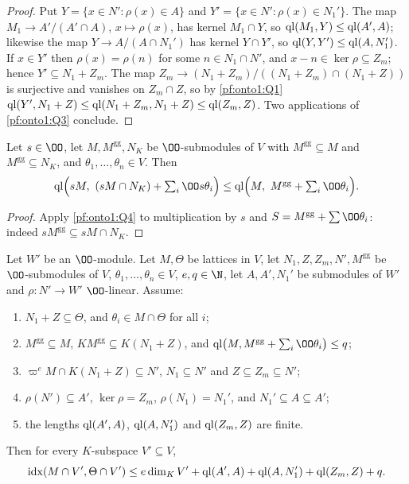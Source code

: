 \begin{proof}
Put $Y=\{x\in N':\rho(x)\in A\}$ and $Y'=\{x\in N':\rho(x)\in N_1'\}$. The map $M_1\to A'/(A'\cap A)$,
$x\mapsto\rho(x)$, has kernel $M_1\cap Y$, so $\operatorname{ql}(M_1,Y)\le\operatorname{ql}(A',A)$; likewise the map $Y\to
A/(A\cap N_1')$ has kernel $Y\cap Y'$, so $\operatorname{ql}(Y,Y')\le\operatorname{ql}(A,N_1')$. If $x\in Y'$ then
$\rho(x)=\rho(n)$ for some $n\in N_1\cap N'$, and $x-n\in\ker\rho\subseteq Z_m$; hence $Y'\subseteq N_1+Z_m$. The
map $Z_m\to(N_1+Z_m)/((N_1+Z_m)\cap(N_1+Z))$ is surjective and vanishes on $Z_m\cap Z$, so by \ref{pf:onto1:Q1}
$\operatorname{ql}(Y',N_1+Z)\le\operatorname{ql}(N_1+Z_m,N_1+Z)\le\operatorname{ql}(Z_m,Z)$. Two applications of \ref{pf:onto1:Q3}
conclude.
\end{proof}

\begin{lemma}[Scaling]\label{pf:onto1:scaled}
Let $s\in\OO$, let $M,M^{\mathrm{gg}},N_K$ be $\OO$-submodules of $V$ with $M^{\mathrm{gg}}\subseteq M$ and
$M^{\mathrm{gg}}\subseteq N_K$, and $\theta_1,\dots,\theta_n\in V$. Then
\[
\ontooneql\Bigl(sM,\ (sM\cap N_K)+\textstyle\sum_i\OO s\theta_i\Bigr)\le
\ontooneql\Bigl(M,\ M^{\mathrm{gg}}+\textstyle\sum_i\OO\theta_i\Bigr).
\]
\end{lemma}

\begin{proof}
Apply \ref{pf:onto1:Q4} to multiplication by $s$ and $S=M^{\mathrm{gg}}+\sum\OO\theta_i$: indeed
$sM^{\mathrm{gg}}\subseteq sM\cap N_K$.
\end{proof}

\begin{proposition}\label{pf:onto1:localStepQ}
Let $W'$ be an $\OO$-module. Let $M,\Theta$ be lattices in $V$, let $N_1,Z,Z_m,N',M^{\mathrm{gg}}$ be $\OO$-submodules
of $V$, $\theta_1,\dots,\theta_n\in V$, $e,q\in\N$, let $A,A',N_1'$ be submodules of $W'$ and $\rho\colon N'\to W'$
$\OO$-linear. Assume:
\begin{enumerate}[label=(\alph*)]
\item $N_1+Z\subseteq\Theta$, and $\theta_i\in M\cap\Theta$ for all $i$;
\item $M^{\mathrm{gg}}\subseteq M$, $KM^{\mathrm{gg}}\subseteq K(N_1+Z)$, and $\ontooneql\bigl(M,M^{\mathrm{gg}}+\sum_i\OO\theta_i\bigr)\le q$;
\item $\varpi^eM\cap K(N_1+Z)\subseteq N'$, $N_1\subseteq N'$ and $Z\subseteq Z_m\subseteq N'$;
\item $\rho(N')\subseteq A'$, $\ker\rho=Z_m$, $\rho(N_1)=N_1'$, and $N_1'\subseteq A\subseteq A'$;
\item the lengths $\operatorname{ql}(A',A)$, $\operatorname{ql}(A,N_1')$ and $\operatorname{ql}(Z_m,Z)$ are finite.
\end{enumerate}
Then for every $K$-subspace $V'\subseteq V$,
\[
\operatorname{idx}(M\cap V',\Theta\cap V')\le e\dim_KV'+\operatorname{ql}(A',A)+\operatorname{ql}(A,N_1')+\operatorname{ql}(Z_m,Z)+q.
\]
\end{proposition}

